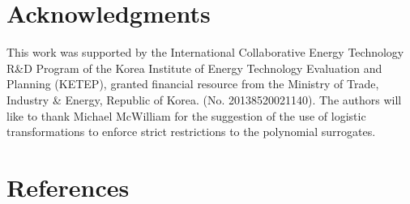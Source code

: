 \documentclass[preprint,12pt]{elsarticle}
\begin{document}

\section{Acknowledgments}

This work was supported by the International Collaborative Energy Technology R\&D Program of the Korea Institute of Energy Technology Evaluation and Planning (KETEP), granted financial resource from the Ministry of Trade, Industry \& Energy, Republic of Korea. (No. 20138520021140). The authors will like to thank Michael McWilliam for the suggestion of the use of logistic transformations to enforce strict restrictions to the polynomial surrogates.




\section*{References}
\small



\end{document}

